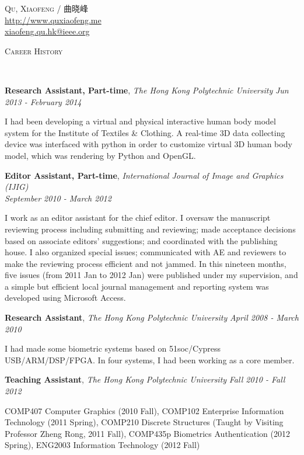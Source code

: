\documentclass[9pt]{article}
\newenvironment{changemargin}[2]{%
  \begin{list}{}{%
    \setlength{\topsep}{0pt}%
    \setlength{\leftmargin}{#1}%
    \setlength{\rightmargin}{#2}%
    \setlength{\listparindent}{\parindent}%
    \setlength{\itemindent}{\parindent}%
    \setlength{\parsep}{\parskip}%
  }%
  \item[]}{\end{list}
}
\newcommand{\lineover}{
	\begin{changemargin}{-0.05in}{-0.05in}
		\vspace*{-8pt}
		\hrulefill \\
		\vspace*{-2pt}
	\end{changemargin}
}
\newcommand{\header}[1]{
	\begin{changemargin}{-0.5in}{-0.5in}
		\scshape{#1}\\
  	\lineover
	\end{changemargin}
}
\newcommand{\contact}[3]{
	\begin{changemargin}{-0.5in}{-0.5in}
		\begin{center}
			{\Large \scshape {#1}}\\ \smallskip
      {\url{#2}}\\ \smallskip 
      {\href{mailto:#3}{#3}}\\ \smallskip
		\end{center}
	\end{changemargin}
}
\newcommand{\jobtitle}[3]{
	\textbf{#1}, \emph{#2} \hfill \emph{#3}\\
}
\newcommand{\jobdescription}[1]{
	\begin{changemargin}{0.15in}{0.15in}
    \smallskip
		{#1}
    \medskip
	\end{changemargin}
}
\newenvironment{body} {
	\vspace*{-16pt}
	\begin{changemargin}{-0.25in}{-0.5in}
  }	
	{\end{changemargin}
}
\begin{document}
\contact{Qu, Xiaofeng / 曲晓峰}{http://www.quxiaofeng.me}{xiaofeng.qu.hk@ieee.org}


\header{Career History}

\begin{body}
  \vspace{14pt}

    \jobtitle{Research Assistant, Part-time}{The Hong Kong Polytechnic University}{Jun 2013 - February 2014}
    \jobdescription{
        I had been developing a virtual and physical interactive human body model system for the Institute of Textiles \& Clothing. A real-time 3D data collecting device was interfaced with python in order to customize virtual 3D human body model, which was rendering by Python and OpenGL.
    }

    \jobtitle{Editor Assistant, Part-time}{International Journal of Image and Graphics (IJIG)\\}{September 2010 - March 2012}
    \jobdescription{
        I work as an editor assistant for the chief editor. I oversaw the manuscript reviewing process including submitting and reviewing; made acceptance decisions based on associate editors' suggestions; and coordinated with the publishing house. I also organized special issues; communicated with AE and reviewers to make the reviewing process efficient and not jammed. In this nineteen months, five issues (from 2011 Jan to 2012 Jan) were published under my supervision, and a simple but efficient local journal management and reporting system was developed using Microsoft Access.
    }

	\jobtitle{Research Assistant}{The Hong Kong Polytechnic University}{April 2008 - March 2010}
    \jobdescription{
        I had made some biometric systems based on 51soc/Cypress USB/ARM/DSP/FPGA. In four systems, I had been working as a core member.
    }

	\jobtitle{Teaching Assistant}{The Hong Kong Polytechnic University}{Fall 2010 - Fall 2012}
    \jobdescription {
        COMP407 Computer Graphics (2010 Fall),
        COMP102 Enterprise Information Technology (2011 Spring), 
        COMP210 Discrete Structures (Taught by Visiting Professor Zheng Rong, 2011 Fall),  COMP435p Biometrics Authentication (2012 Spring), 
        ENG2003 Information Technology (2012 Fall)
    }

\end{body}
\end{document}
